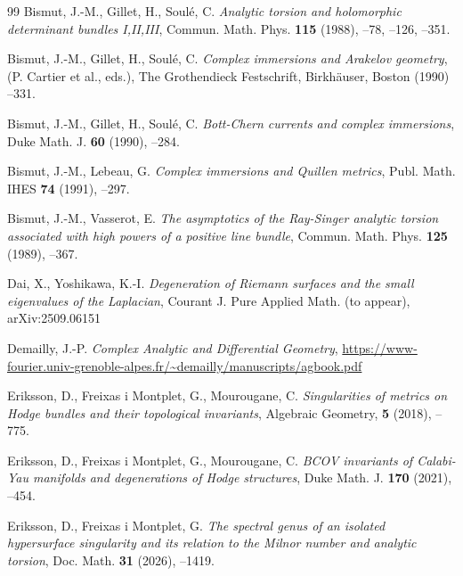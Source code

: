 \documentclass[amscd, leqno]{amsart}
\theoremstyle{plain}
\theoremstyle{definition}
\theoremstyle{remark}
\begin{document}
\begin{thebibliography}{99}
Bismut, J.-M., Gillet, H., Soul\'e, C.
\newblock 
\textit{Analytic torsion and holomorphic determinant bundles I,II,III},
\newblock 
Commun. Math. Phys.
\newblock 
{\bf 115}
\newblock 
(1988),
--78, 
--126, 
--351.


Bismut, J.-M., Gillet, H., Soul\'e, C.
\newblock 
\textit{Complex immersions and Arakelov geometry},
\newblock 
(P. Cartier et al., eds.), The Grothendieck Festschrift,
\newblock 
Birkh\"auser,
\newblock 
Boston
\newblock 
(1990)
--331.


Bismut, J.-M., Gillet, H., Soul\'e, C.
\newblock 
\textit{Bott-Chern currents and complex immersions},
\newblock
Duke Math. J.
\newblock
{\bf 60}
\newblock
(1990),
--284.


Bismut, J.-M., Lebeau, G.
\newblock 
\textit{Complex immersions and Quillen metrics},
\newblock 
Publ. Math. IHES
\newblock 
{\bf 74}
\newblock 
(1991),
--297.


Bismut, J.-M., Vasserot, E.
\newblock
\textit{The asymptotics of the Ray-Singer analytic torsion associated with high powers of a positive line bundle},
Commun. Math. Phys.
\newblock 
{\bf 125}
\newblock 
(1989),
--367. 


Dai, X., Yoshikawa, K.-I.
\newblock
{\em Degeneration of Riemann surfaces and the small eigenvalues of the Laplacian},
\newblock
Courant J.  Pure Applied Math. (to appear),
\newblock
arXiv:2509.06151


Demailly, J.-P.
\newblock 
\textit{Complex Analytic and Differential Geometry},
\newblock 
\url{https://www-fourier.univ-grenoble-alpes.fr/~demailly/manuscripts/agbook.pdf}


Eriksson, D., Freixas i Montplet, G., Mourougane, C.
\newblock
\textit{Singularities of metrics on Hodge bundles and their topological invariants},
\newblock
Algebraic Geometry,
\newblock
{\bf 5}
\newblock
(2018),
--775.


Eriksson, D., Freixas i Montplet, G., Mourougane, C.
\newblock
\textit{BCOV invariants of Calabi-Yau manifolds and degenerations of Hodge structures},
\newblock
Duke Math. J.
\newblock
{\bf 170}
\newblock
(2021),
--454.


Eriksson, D., Freixas i Montplet, G.
\newblock
\textit{The spectral genus of an isolated hypersurface singularity and its relation to the Milnor number and analytic torsion},
\newblock
Doc. Math. 
\newblock
{\bf 31}
\newblock
(2026),
--1419.



\end{thebibliography}
\end{document}
